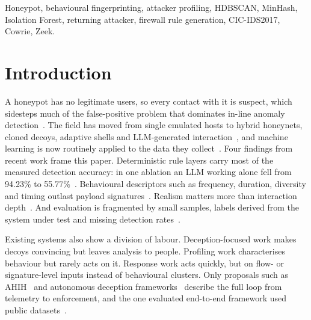 \documentclass[conference]{IEEEtran}
\begin{document}
\begin{abstract}
simulated firewall 108,849 events/s, and no allowlisted event was ever dropped. The rule-based categoriser labelled only 3 of 7 returning classes correctly, which we trace to rate thresholds invalidated by time compression. All numbers are feasibility evidence, and two scripts regenerate them on the real datasets.
\end{abstract}

\begin{IEEEkeywords}
Honeypot, behavioural fingerprinting, attacker profiling, HDBSCAN, MinHash, Isolation Forest, returning attacker, firewall rule generation, CIC-IDS2017, Cowrie, Zeek.
\end{IEEEkeywords}

\section{Introduction}
A honeypot has no legitimate users, so every contact with it is suspect, which sidesteps much of the false-positive problem that dominates in-line anomaly detection~\cite{moric2025,qurbonaliyeva2024}. The field has moved from single emulated hosts to hybrid honeynets, cloned decoys, adaptive shells and LLM-generated interaction~\cite{mahija2025,aseres2026,maraden2026,sladic2024,wang2024,gazdar2025}, and machine learning is now routinely applied to the data they collect~\cite{lanz2025,oliveira2026}. Four findings from recent work frame this paper. Deterministic rule layers carry most of the measured detection accuracy: in one ablation an LLM working alone fell from 94.23\% to 55.77\%~\cite{oliveira2026}. Behavioural descriptors such as frequency, duration, diversity and timing outlast payload signatures~\cite{savage2025,lim2026,beltran2026}. Realism matters more than interaction depth~\cite{maraden2026,zhang2023}. And evaluation is fragmented by small samples, labels derived from the system under test and missing detection rates~\cite{aseres2026,oliveira2026,balogh2025}.

Existing systems also show a division of labour. Deception-focused work makes decoys convincing but leaves analysis to people. Profiling work characterises behaviour but rarely acts on it. Response work acts quickly, but on flow- or signature-level inputs instead of behavioural clusters. Only proposals such as AHIH~\cite{aseres2026} and autonomous deception frameworks~\cite{shahzad2026} describe the full loop from telemetry to enforcement, and the one evaluated end-to-end framework used public datasets~\cite{beltran2026}.
\end{document}
